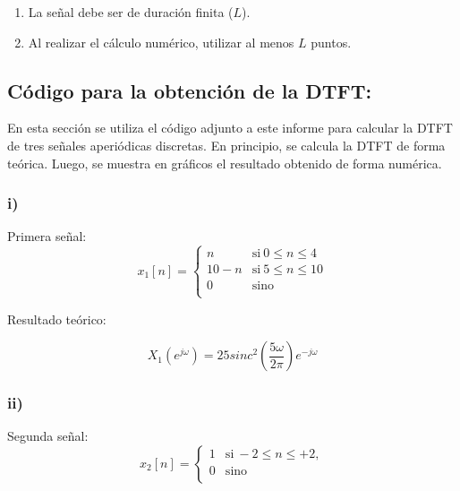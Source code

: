 \documentclass[11pt,a4paper]{article}
\begin{document}
        \begin{enumerate}
            \item La señal debe ser de duración finita ($L$).
            \item Al realizar el cálculo numérico, utilizar al menos $L$ puntos.
        \end{enumerate}
    
    \subsection{Código para la obtención de la DTFT:}
    En esta sección se utiliza el código adjunto a este informe para calcular la DTFT de tres señales aperiódicas discretas. En principio, se calcula la DTFT de forma teórica. Luego, se muestra en gráficos el resultado obtenido de forma numérica.
    

    \subsubsection*{i)}
    Primera señal:
    \begin{equation}
    x_{1}[n] = \left\{ 
        \begin{array}{ll} 
        n & \mathrm{si\ } 0\leq n \leq 4 \\
        10-n & \mathrm{si\ } 5\leq n \leq 10 \\
        0 & \mathrm{sino\ } \\
        \end{array} 
        \right.
    \end{equation}
    
    
    Resultado teórico:
    
    
    \begin{equation}
    X_{1}(e^{j \omega})=25 sinc^{2}\left(\frac{5 \omega}{2 \pi}\right) e^{- j \omega} 
    \end{equation}

    \subsubsection*{ii)}
    Segunda señal:
    \begin{equation} 
        x_{2}[n] = \left\{ 
        \begin{array}{ll} 
        1 & \mathrm{si\ } -2\leq n \leq +2, \\
        0 & \mathrm{sino\ } \\
        \end{array} 
        \right.
    \end{equation}
\end{document}
